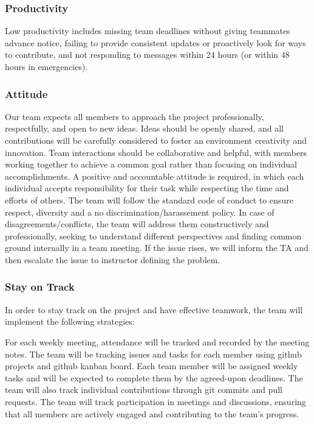 \documentclass{article}
\begin{document}
\subsubsection*{Productivity} 

Low productivity includes missing team deadlines without giving teammates advance notice, failing to provide consistent updates or proactively look for ways to contribute,
and not responding to messages within 24 hours (or within 48 hours in emergencies).


\subsubsection*{Attitude}

Our team expects all members to approach the project professionally, respectfully, and open to new ideas. Ideas should be openly shared, and all contributions
will be carefully considered to foster an environment creativity and innovation. Team interactions should be collaborative and helpful, with members working together to 
achieve a common goal rather than focusing on individual accomplishments. A positive and accountable attitude is required, in which each individual accepts
responsibility for their task while respecting the time and efforts of others. The team will follow the standard code of conduct to ensure respect, diversity and a no discrimination/harassement policy.
In case of disagreements/conflicts, the team will address them constructively and professionally, seeking to understand different perspectives and finding common ground internally in a team meeting.
If the issue rises, we will inform the TA and then escalate the issue to instructor defining the problem.

\subsubsection*{Stay on Track}

In order to stay track on the project and have effective teamwork, the team will implement the following strategies:


\noindent For each weekly meeting, attendance will be tracked and recorded by the meeting notes. The team will be tracking issues and tasks for each member using 
github projects and github kanban board. Each team member will be assigned weekly tasks and will be expected to complete them by the agreed-upon deadlines. 
The team will also track individual contributions through git commits and pull requests. The team will track participation in meetings and discussions, 
ensuring that all members are actively engaged and contributing to the team's progress.
\end{document}
